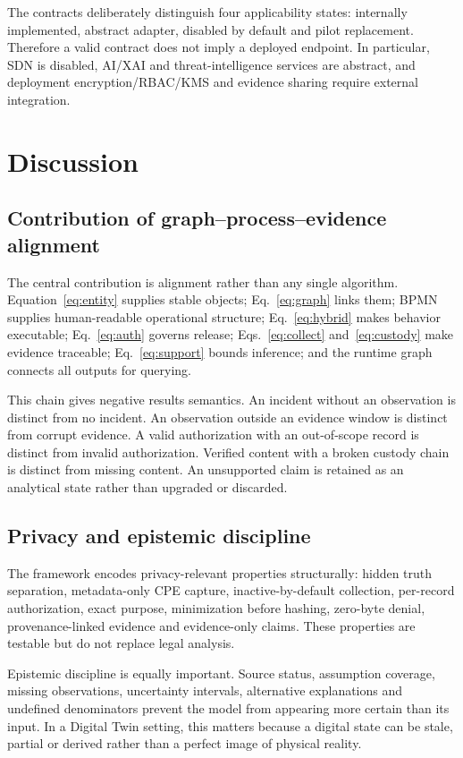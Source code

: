 ﻿\documentclass[10pt,a4paper,twocolumn]{article}
\begin{document}
The contracts deliberately distinguish four applicability states: internally implemented, abstract adapter, disabled by default and pilot replacement. Therefore a valid contract does not imply a deployed endpoint. In particular, SDN is disabled, AI/XAI and threat-intelligence services are abstract, and deployment encryption/RBAC/KMS and evidence sharing require external integration.

\section{Discussion}

\subsection{Contribution of graph--process--evidence alignment}

The central contribution is alignment rather than any single algorithm. Equation~\eqref{eq:entity} supplies stable objects; Eq.~\eqref{eq:graph} links them; BPMN supplies human-readable operational structure; Eq.~\eqref{eq:hybrid} makes behavior executable; Eq.~\eqref{eq:auth} governs release; Eqs.~\eqref{eq:collect} and~\eqref{eq:custody} make evidence traceable; Eq.~\eqref{eq:support} bounds inference; and the runtime graph connects all outputs for querying.

This chain gives negative results semantics. An incident without an observation is distinct from no incident. An observation outside an evidence window is distinct from corrupt evidence. A valid authorization with an out-of-scope record is distinct from invalid authorization. Verified content with a broken custody chain is distinct from missing content. An unsupported claim is retained as an analytical state rather than upgraded or discarded.

\subsection{Privacy and epistemic discipline}

The framework encodes privacy-relevant properties structurally: hidden truth separation, metadata-only CPE capture, inactive-by-default collection, per-record authorization, exact purpose, minimization before hashing, zero-byte denial, provenance-linked evidence and evidence-only claims. These properties are testable but do not replace legal analysis.

Epistemic discipline is equally important. Source status, assumption coverage, missing observations, uncertainty intervals, alternative explanations and undefined denominators prevent the model from appearing more certain than its input. In a Digital Twin setting, this matters because a digital state can be stale, partial or derived rather than a perfect image of physical reality.
\end{document}
